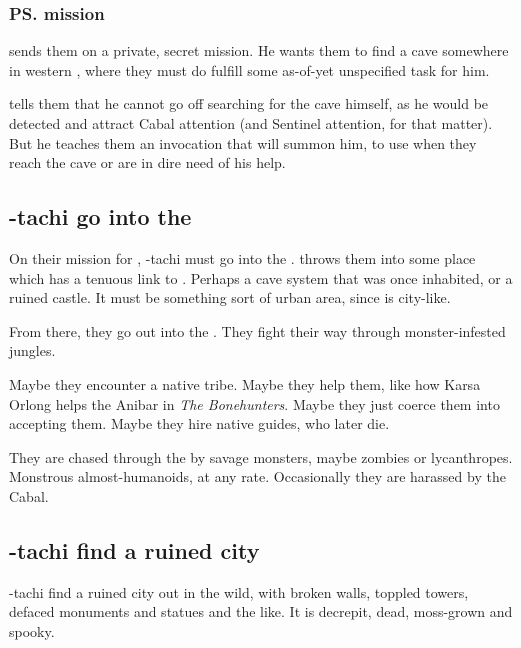 \subsubsection{\ps{\Ishnaruchaefir} mission}
\Ishnaruchaefir{} sends them on a private, secret mission. He wants them to find a cave somewhere in western \Velcad{}, where they must do fulfill some as-of-yet unspecified task for him. 

\Ishnaruchaefir{} tells them that he cannot go off searching for the cave himself, as he would be detected and attract Cabal attention (and Sentinel attention, for that matter). But he teaches them an invocation that will summon him, to use when they reach the cave or are in dire need of his help. 








\subsection{\Shilred-tachi go into the \Wylde}
On their mission for \Ishnaruchaefir, \Shilred-tachi must go into the \Wylde{}. \Ishnaruchaefir{} throws them into some place which has a tenuous link to \Nyx. Perhaps a cave system that was once inhabited, or a ruined castle. It must be something sort of urban area, since \Nyx{} is city-like. 

From there, they go out into the \Wylde{}. They fight their way through monster-infested jungles. 

Maybe they encounter a native tribe. Maybe they help them, like how Karsa Orlong helps the Anibar in \emph{The Bonehunters}. Maybe they just coerce them into accepting them. Maybe they hire native guides, who later die. 

They are chased through the \Wylde{} by savage monsters, maybe zombies or lycanthropes. Monstrous almost-humanoids, at any rate. Occasionally they are harassed by the Cabal. 







\subsection{\Shilred-tachi find a ruined city}
\Shilred-tachi find a ruined city out in the wild, with broken walls, toppled towers, defaced monuments and statues and the like. It is decrepit, dead, moss-grown and spooky. 

